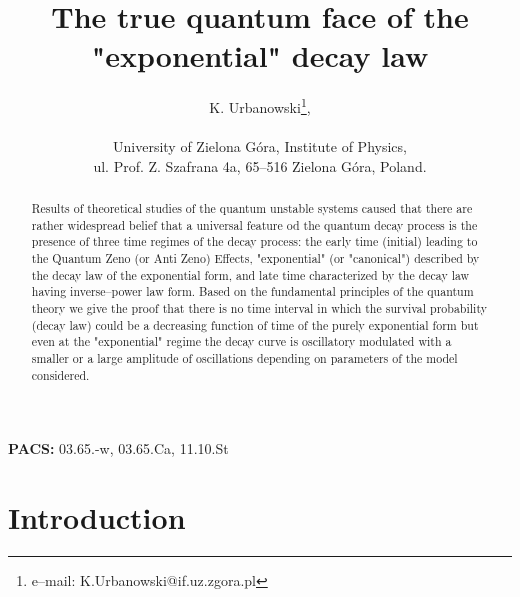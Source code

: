 \documentclass[12pt]{article}
\begin{document}
\title{The true quantum face of the "exponential" decay law}
\author{K. Urbanowski\footnote{e--mail:  K.Urbanowski@if.uz.zgora.pl}, \\
\hfill\\
University of Zielona G\'{o}ra, Institute of Physics, \\
ul. Prof. Z. Szafrana 4a, 65--516 Zielona G\'{o}ra, Poland.
}
\maketitle


\begin{abstract}
Results of theoretical studies of the quantum unstable systems caused that
there are rather widespread belief that a universal feature od the quantum decay process is the presence of three
time regimes of the decay process:
the early time (initial) leading to the Quantum Zeno (or Anti Zeno) Effects, "exponential" (or "canonical") described by the decay law of the exponential form, and late time characterized by the decay law having inverse--power law form. Based on the fundamental principles of the quantum theory
we give the proof that there is no time interval in which the survival probability (decay law) could be a decreasing function of time of the purely exponential form
but even at the "exponential" regime the decay curve is oscillatory modulated
with a smaller or a large amplitude of oscillations depending on parameters of the model considered.
\end{abstract}
\noindent
{\bf PACS:} 03.65.-w, 03.65.Ca, 11.10.St \\


\section{Introduction}
\end{document}
